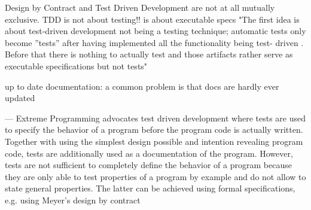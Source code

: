 Design by Contract and Test Driven Development are not at all mutually exclusive.
TDD is not about testing!! is about executable specs
"The first idea is about test-driven development not being a testing technique;
automatic tests only become ”tests” after having implemented all the functionality
being test-
driven
. Before that there is nothing to actually
test
and those artifacts
rather serve as executable
specifications
but not tests"

up to date documentation: a common problem is that docs are hardly ever updated


---
Extreme Programming advocates test driven development where tests are used
to specify the behavior of a program before the program code is actually written.
Together with using the simplest design possible and intention revealing program
code, tests are additionally used as a documentation of the program. However,
tests are not sufficient to completely define the behavior of a program because
they are only able to test properties of a program by example and do not allow to
state general properties. The latter can be achieved using formal specifications,
e.g. using Meyer’s design by contract %